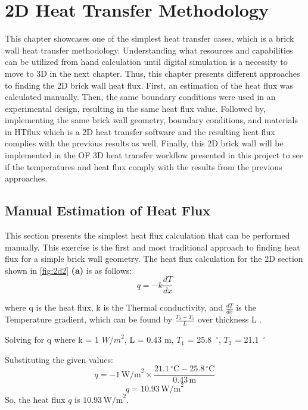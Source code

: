 
\chapter{2D Heat Transfer Methodology}

This chapter showcases one of the simplest heat transfer cases, which is a brick wall heat transfer methodology.
Understanding what resources and capabilities can be utilized from hand calculation until digital simulation is a necessity to move to 3D in the next chapter. Thus, this chapter presents different approaches to finding the 2D brick wall heat flux. First, an estimation of the heat flux was calculated manually. Then, the same boundary conditions were used in an experimental design, resulting in the same heat flux value. Followed by, implementing the same brick wall geometry, boundary conditions, and materials in HTflux which is a 2D heat transfer software and the resulting heat flux complies with the previous results as well. %
Finally, this 2D brick wall will be implemented in the \gls{OF} 3D heat transfer workflow presented in this project to see if the temperatures and heat flux comply with the results from the previous approaches. 




\section{Manual Estimation of Heat Flux}
This section presents the simplest heat flux calculation that can be performed manually. This exercise is the first and most traditional approach to finding heat flux for a simple brick wall geometry. The heat flux calculation for the 2D section shown in \ref{fig:2d2} \textbf{(a)} is as follows:
\begin{equation}
q = -k \frac{dT}{dx}
\end{equation}

where q is the heat flux,
k is the Thermal conductivity, and
$\frac{dT}{dx}$ is the Temperature gradient, which can be found by $\frac{T_2 - T_1}{L}$ over thickness L \cite{heattransfund}. 

Solving for q where k = 1 ${W/m}^2$, 
L = 0.43 m,
$T_1$ = 25.8\, $^\circ$, 
$T_2$  = 21.1\, $^\circ$



Substituting the given values:
\[ q = -1 \, \text{W/m}^2 \times \frac{21.1 \, ^\circ \text{C} - 25.8 \, ^\circ \text{C}}{0.43 \, \text{m}} \]
\[ q = 10.93 \, \text{W/m}^2 \]
So, the heat flux \( q \) is \( 10.93 \, \text{W/m}^2 \).






